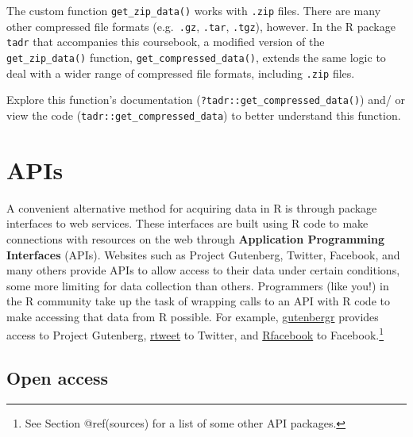 \documentclass[
  letterpaper,
]{latex/krantz}
\begin{document}
\begin{tcolorbox}[enhanced jigsaw, toprule=.15mm, bottomtitle=1mm, coltitle=black, title=\textcolor{quarto-callout-warning-color}{\faExclamationTriangle}\hspace{0.5em}{Tip}, left=2mm, colframe=quarto-callout-warning-color-frame, bottomrule=.15mm, colbacktitle=quarto-callout-warning-color!10!white, leftrule=.75mm, colback=white, titlerule=0mm, breakable, toptitle=1mm, opacityback=0, arc=.35mm, rightrule=.15mm, opacitybacktitle=0.6]

The custom function \texttt{get\_zip\_data()} works with \texttt{.zip}
files. There are many other compressed file formats (e.g.~\texttt{.gz},
\texttt{.tar}, \texttt{.tgz}), however. In the R package \texttt{tadr}
that accompanies this coursebook, a modified version of the
\texttt{get\_zip\_data()} function, \texttt{get\_compressed\_data()},
extends the same logic to deal with a wider range of compressed file
formats, including \texttt{.zip} files.

Explore this function's documentation
(\texttt{?tadr::get\_compressed\_data()}) and/ or view the code
(\texttt{tadr::get\_compressed\_data}) to better understand this
function.

\end{tcolorbox}

\hypertarget{apis}{%
\section{APIs}\label{apis}}

A convenient alternative method for acquiring data in R is through
package interfaces to web services. These interfaces are built using R
code to make connections with resources on the web through
\textbf{Application Programming Interfaces} (APIs). Websites such as
Project Gutenberg, Twitter, Facebook, and many others provide APIs to
allow access to their data under certain conditions, some more limiting
for data collection than others. Programmers (like you!) in the R
community take up the task of wrapping calls to an API with R code to
make accessing that data from R possible. For example,
\href{https://CRAN.R-project.org/package=gutenbergr}{gutenbergr}
provides access to Project Gutenberg,
\href{https://CRAN.R-project.org/package=rtweet}{rtweet} to Twitter, and
\href{https://CRAN.R-project.org/package=Rfacebook}{Rfacebook} to
Facebook.\footnote{See Section @ref(sources) for a list of some other
  API packages.}

\hypertarget{open-access}{%
\subsection{Open access}\label{open-access}}
\end{document}
